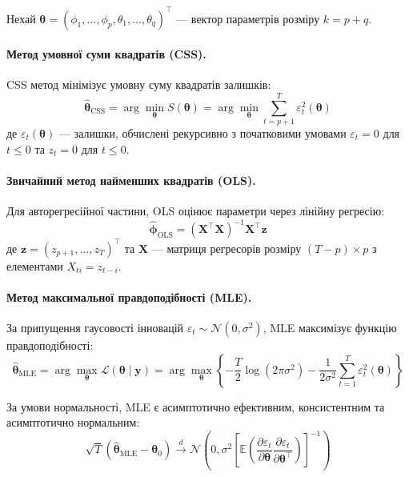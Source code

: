\documentclass[12pt,a4paper]{article}
\begin{document}
Нехай $\boldsymbol{\theta} = (\phi_1, \ldots, \phi_p, \theta_1, \ldots, \theta_q)^\top$ --- вектор параметрів розміру $k = p + q$.

\paragraph{Метод умовної суми квадратів (CSS).}

CSS метод мінімізує умовну суму квадратів залишків:
\begin{equation}
\label{eq:css}
\hat{\boldsymbol{\theta}}_{\text{CSS}} = \arg\min_{\boldsymbol{\theta}} S(\boldsymbol{\theta}) = \arg\min_{\boldsymbol{\theta}} \sum_{t=p+1}^{T} \varepsilon_t^2(\boldsymbol{\theta})
\end{equation}
де $\varepsilon_t(\boldsymbol{\theta})$ --- залишки, обчислені рекурсивно з початковими умовами $\varepsilon_t = 0$ для $t \leq 0$ та $z_t = 0$ для $t \leq 0$.

\paragraph{Звичайний метод найменших квадратів (OLS).}

Для авторегресійної частини, OLS оцінює параметри через лінійну регресію:
\begin{equation}
\label{eq:ols}
\hat{\boldsymbol{\phi}}_{\text{OLS}} = (\mathbf{X}^\top \mathbf{X})^{-1} \mathbf{X}^\top \mathbf{z}
\end{equation}
де $\mathbf{z} = (z_{p+1}, \ldots, z_T)^\top$ та $\mathbf{X}$ --- матриця регресорів розміру $(T-p) \times p$ з елементами $X_{ti} = z_{t-i}$.

\paragraph{Метод максимальної правдоподібності (MLE).}

За припущення гаусовості інновацій $\varepsilon_t \sim \mathcal{N}(0, \sigma^2)$, MLE максимізує функцію правдоподібності:
\begin{equation}
\label{eq:mle}
\hat{\boldsymbol{\theta}}_{\text{MLE}} = \arg\max_{\boldsymbol{\theta}} \mathcal{L}(\boldsymbol{\theta} \mid \mathbf{y}) = \arg\max_{\boldsymbol{\theta}} \left\{ -\frac{T}{2} \log(2\pi\sigma^2) - \frac{1}{2\sigma^2} \sum_{t=1}^{T} \varepsilon_t^2(\boldsymbol{\theta}) \right\}
\end{equation}

За умови нормальності, MLE є асимптотично ефективним, консистентним та асимптотично нормальним:
\begin{equation}
\label{eq:mle_asymptotic}
\sqrt{T}(\hat{\boldsymbol{\theta}}_{\text{MLE}} - \boldsymbol{\theta}_0) \xrightarrow{d} \mathcal{N}\left(0, \sigma^2 \left[\mathbb{E}\left(\frac{\partial \varepsilon_t}{\partial \boldsymbol{\theta}} \frac{\partial \varepsilon_t}{\partial \boldsymbol{\theta}^\top}\right)\right]^{-1}\right)
\end{equation}
\end{document}
